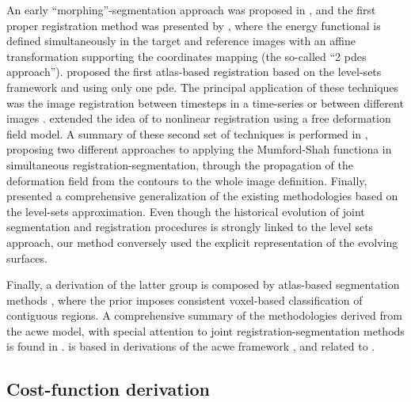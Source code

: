 An early ``morphing''-segmentation approach was proposed in \citep{bertalmio_morphing_2000},
  and the first proper registration method was presented by \citeauthor{yezzi_variational_2001}
  \citep{yezzi_variational_2001}, where the energy functional is defined simultaneously in the target
  and reference images with an affine transformation supporting the coordinates mapping
  (the so-called ``2 \glspl*{pde} approach'').
\citeauthor{vemuri_joint_2003} proposed the first atlas-based registration \citep{vemuri_joint_2003}
  based on the level-sets framework and using only one \gls*{pde}.
The principal application of these techniques was the image registration between timesteps in
  a time-series or between different images \citep{paragios_level_2003}.
\citeauthor{unal_coupled_2005} \citep{unal_coupled_2005} extended the idea of
  \citep{bertalmio_morphing_2000,yezzi_variational_2001} to nonlinear registration
  using a free deformation field model.
A summary of these second set of techniques is performed in \citep{droske_mumfordshah_2009},
  proposing two different approaches to applying the Mumford-Shah functiona
  \citep{mumford_optimal_1989} in simultaneous registration-segmentation, through the propagation
  of the deformation field from the contours to the whole image definition.
Finally, \citeauthor{gorthi_active_2011} presented a comprehensive generalization of the
  existing methodologies \citep{gorthi_active_2011} based on the level-sets approximation.
Even though the historical evolution of joint segmentation and registration procedures is strongly
  linked to the level sets approach, our method conversely used the explicit representation of
  the evolving surfaces.

Finally, a derivation of the latter group is composed by atlas-based segmentation methods
  \citep{gorthi_segmentation_2009,gorthi_active_2011,pohl_unifying_2005,pohl_bayesian_2006,
  wang_joint_2006}, where the prior imposes consistent voxel-based classification of contiguous
  regions.
A comprehensive summary of the methodologies derived from the \acrlong{acwe} model, with special attention
  to joint registration-segmentation methods is found in \citep{gorthi_active_2011}.
is based in derivations of the \acrlong{acwe}
  framework \citep{chan_active_2001}, and related to \citep{guyader_combined_2011}.


\subsection{Cost-function derivation}
\label{sec:methods_map}

